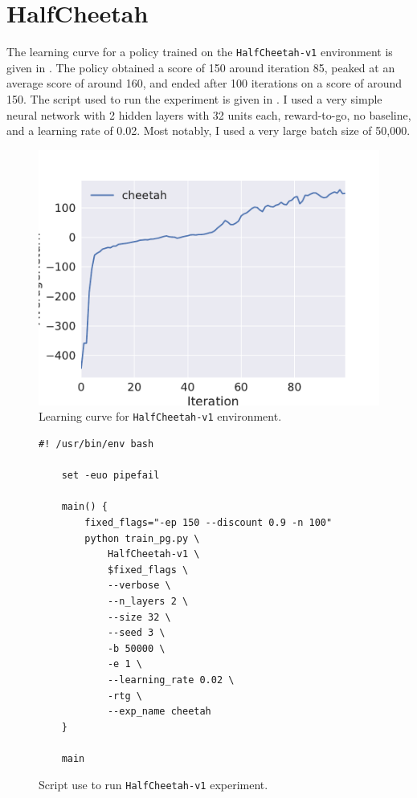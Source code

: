 \section{HalfCheetah}
The learning curve for a policy trained on the \texttt{HalfCheetah-v1}
environment is given in . The policy obtained a score of 150
around iteration 85, peaked at an average score of around 160, and ended after
100 iterations on a score of around 150. The script used to run the experiment
is given in . I used a very simple neural network with 2
hidden layers with 32 units each, reward-to-go, no baseline, and a learning
rate of 0.02. Most notably, I used a very large batch size of 50,000.

\begin{figure}[h]
  \centering
  \includegraphics[width=\textwidth]{cheetah.pdf}
  \caption{Learning curve for \texttt{HalfCheetah-v1} environment.}
  \label{fig:cheetah}
\end{figure}

\begin{figure}
  \centering
  \footnotesize
  \begin{Verbatim}[gobble=4]
    #! /usr/bin/env bash

    set -euo pipefail

    main() {
        fixed_flags="-ep 150 --discount 0.9 -n 100"
        python train_pg.py \
            HalfCheetah-v1 \
            $fixed_flags \
            --verbose \
            --n_layers 2 \
            --size 32 \
            --seed 3 \
            -b 50000 \
            -e 1 \
            --learning_rate 0.02 \
            -rtg \
            --exp_name cheetah
    }

    main
  \end{Verbatim}
  \caption{Script use to run \texttt{HalfCheetah-v1} experiment.}
  \label{fig:cheetah-script}
\end{figure}
